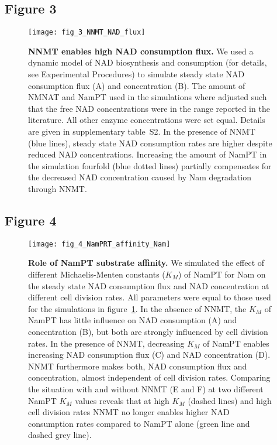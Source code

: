 \newpage


\subsection*{Figure 3}

\begin{figure}[ht]
  \centering
  \texttt{[image: fig\_3\_NNMT\_NAD\_flux]}
  \caption{\textbf{NNMT enables high NAD consumption flux.} We used a dynamic model of NAD biosynthesis and consumption (for details, see Experimental Procedures) to simulate steady state NAD consumption flux (A) and concentration (B). The amount of NMNAT and NamPT used in the simulations where adjusted such that the free NAD concentrations were in the range reported in the literature. All other enzyme concentrations were set equal. Details are given in supplementary table~S2. In the presence of NNMT (blue lines), steady state NAD consumption rates are higher despite reduced NAD concentrations. Increasing the amount of NamPT in the simulation fourfold (blue dotted lines) partially compensates for the decreased NAD concentration caused by Nam degradation through NNMT.}
  \label{fig:NNMT_NAD_flux}
\end{figure}

\newpage


\subsection*{Figure 4}

\begin{figure}[ht]
  \centering
  \texttt{[image: fig\_4\_NamPRT\_affinity\_Nam]}
  \caption{\textbf{Role of NamPT substrate affinity.} We simulated the effect of different Michaelis-Menten constants ($K_{M}$) of NamPT for Nam on the steady state NAD consumption flux and NAD concentration at different cell division rates. All parameters were equal to those used for the simulations in figure~\ref{fig:NNMT_NAD_flux}. In the absence of NNMT, the $K_{M}$ of NamPT has little influence on NAD consumption (A) and concentration (B), but both are strongly influenced by cell division rates. In the presence of NNMT, decreasing $K_{M}$ of NamPT enables increasing NAD consumption flux (C) and NAD concentration (D). NNMT furthermore makes both, NAD consumption flux and concentration, almost independent of cell division rates. Comparing the situation with and without NNMT (E and F) at two different NamPT $K_{M}$ values reveals that at high $K_{M}$ (dashed lines) and high cell division rates NNMT no longer enables higher NAD consumption rates compared to NamPT alone (green line and dashed grey line).}
  \label{fig:NamPT_affinity_Nam}
\end{figure}

